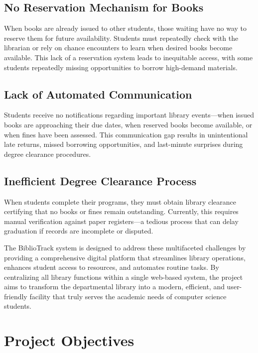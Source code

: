 \documentclass[12pt,a4paper]{report}
\begin{document}
\subsection{No Reservation Mechanism for Books}

When books are already issued to other students, those waiting have no way to reserve them for future availability. Students must repeatedly check with the librarian or rely on chance encounters to learn when desired books become available. This lack of a reservation system leads to inequitable access, with some students repeatedly missing opportunities to borrow high-demand materials.

\subsection{Lack of Automated Communication}

Students receive no notifications regarding important library events—when issued books are approaching their due dates, when reserved books become available, or when fines have been assessed. This communication gap results in unintentional late returns, missed borrowing opportunities, and last-minute surprises during degree clearance procedures.

\subsection{Inefficient Degree Clearance Process}

When students complete their programs, they must obtain library clearance certifying that no books or fines remain outstanding. Currently, this requires manual verification against paper registers—a tedious process that can delay graduation if records are incomplete or disputed.

The BiblioTrack system is designed to address these multifaceted challenges by providing a comprehensive digital platform that streamlines library operations, enhances student access to resources, and automates routine tasks. By centralizing all library functions within a single web-based system, the project aims to transform the departmental library into a modern, efficient, and user-friendly facility that truly serves the academic needs of computer science students. 

\section{Project Objectives}
\label{sec:objectives}
\end{document}
